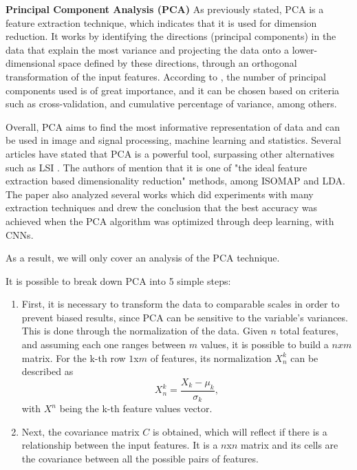 \begin{description}
\item \textbf{Principal Component Analysis (PCA)}
As previously stated, \gls{PCA} is a feature extraction technique, which indicates that it is used for dimension reduction. It works by identifying the directions (principal components) in the data that explain the most variance and projecting the data onto a lower-dimensional space defined by these directions, through an orthogonal transformation of the input features.
According to \cite{featureExtraction_PCA_LSI}, the number of principal components used is of great importance, and it can be chosen based on criteria such as cross-validation, and cumulative percentage of variance, among others. 

Overall, \gls{PCA} aims to find the most informative representation of data and can be used in image and signal processing, machine learning and statistics. Several articles have stated that \gls{PCA} is a powerful tool, surpassing other alternatives such as \gls{LSI} \cite{featureExtraction_PCA_LSI}. The authors of \cite{comprehensiveReviewFeatureExtraction} mention that it is one of "the ideal feature extraction based dimensionality reduction" methods, among \gls{ISOMAP} and \gls{LDA}. The paper also analyzed several works which did experiments with many extraction techniques and drew the conclusion that the best accuracy was achieved when the PCA algorithm was optimized through deep learning, with \glspl{CNN}.

As a result, we will only cover an analysis of the PCA technique.

It is possible to break down \gls{PCA} into 5 simple steps:
\begin{enumerate}
    \item First, it is necessary to transform the data to comparable scales in order to prevent biased results, since PCA can be sensitive to the variable's variances. This is done through the normalization of the data. Given $n$ total features, and assuming each one ranges between $m$ values, it is possible to build a $nxm$ matrix. For the k-th row $1$x$m$ of features, its normalization $X^k_n$ can be described as
    \begin{equation}
       \label{eq:normalizationPCA}
       X^k_n = \frac{X_k - \mu_k}{\sigma_k}, 
    \end{equation}
    with $X^n$ being the k-th feature values vector. 

    \item Next, the covariance matrix $C$ is obtained, which will reflect if there is a relationship between the input features. It is a $n$x$n$ matrix and its cells are the covariance between all the possible pairs of features. 


\end{enumerate}
\end{description}
